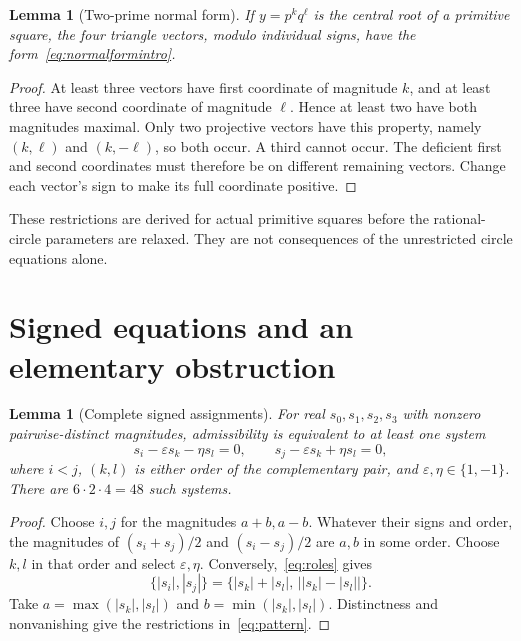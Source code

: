 \documentclass[11pt,letterpaper]{article}
\newtheorem{lemma}[theorem]{Lemma}
\theoremstyle{definition}\newtheorem{definition}[theorem]{Definition}
\theoremstyle{remark}\newtheorem{remark}[theorem]{Remark}
\begin{document}
\begin{lemma}[Two-prime normal form]\label{lem:twoform}
If $y=p^kq^\ell$ is the central root of a primitive square, the four triangle vectors, modulo individual signs, have the form~\eqref{eq:normalformintro}.
\end{lemma}
\begin{proof}
At least three vectors have first coordinate of magnitude $k$, and at least three have second coordinate of magnitude $\ell$. Hence at least two have both magnitudes maximal. Only two projective vectors have this property, namely $(k,\ell)$ and $(k,-\ell)$, so both occur. A third cannot occur. The deficient first and second coordinates must therefore be on different remaining vectors. Change each vector's sign to make its full coordinate positive.
\end{proof}
These restrictions are derived for actual primitive squares before the rational-circle parameters are relaxed. They are not consequences of the unrestricted circle equations alone.

\section{Signed equations and an elementary obstruction}\label{sec:equations}
\begin{lemma}[Complete signed assignments]\label{lem:roles}
For real $s_0,s_1,s_2,s_3$ with nonzero pairwise-distinct magnitudes, admissibility is equivalent to at least one system
\begin{equation}\label{eq:roles}
 s_i-\varepsilon s_k-\eta s_l=0,\qquad
 s_j-\varepsilon s_k+\eta s_l=0,
\end{equation}
where $i<j$, $(k,l)$ is either order of the complementary pair, and $\varepsilon,\eta\in\{1,-1\}$. There are $6\cdot2\cdot4=48$ such systems.
\end{lemma}
\begin{proof}
Choose $i,j$ for the magnitudes $a+b,a-b$. Whatever their signs and order, the magnitudes of $(s_i+s_j)/2$ and $(s_i-s_j)/2$ are $a,b$ in some order. Choose $k,l$ in that order and select $\varepsilon,\eta$. Conversely,~\eqref{eq:roles} gives
\[
 \{|s_i|,|s_j|\}
 =\{|s_k|+|s_l|,\,\bigl||s_k|-|s_l|\bigr|\}.
\]
Take $a=\max(|s_k|,|s_l|)$ and $b=\min(|s_k|,|s_l|)$. Distinctness and nonvanishing give the restrictions in~\eqref{eq:pattern}.
\end{proof}
\end{document}
